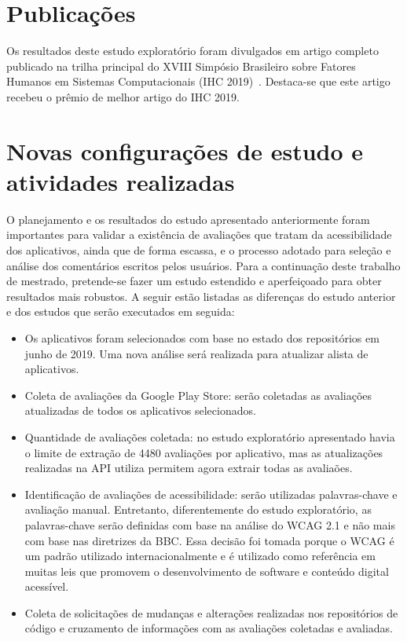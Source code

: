 \section{Publicações}

Os resultados deste estudo exploratório foram divulgados em artigo completo publicado na trilha principal do XVIII Simpósio Brasileiro sobre Fatores Humanos em Sistemas Computacionais (IHC 2019)~\cite{ihc2019}. Destaca-se que este artigo recebeu o prêmio de melhor artigo do IHC 2019. 

\section{Novas configurações de estudo e atividades realizadas}

O planejamento e os resultados do estudo apresentado anteriormente foram importantes para validar a existência de avaliações que tratam da acessibilidade dos aplicativos, ainda que de forma escassa, e o processo adotado para seleção e análise dos comentários escritos pelos usuários. 
Para a continuação deste trabalho de mestrado, pretende-se fazer um estudo estendido e aperfeiçoado para obter resultados mais robustos. A seguir estão listadas as diferenças do estudo anterior e dos estudos que serão executados em seguida:
\begin{itemize}
 \item Os aplicativos foram selecionados com base no estado dos repositórios em junho de 2019. Uma nova análise será realizada para atualizar alista de aplicativos.
 \item Coleta de avaliações da Google Play Store: serão coletadas as avaliações atualizadas de todos os aplicativos selecionados.
 \item Quantidade de avaliações coletada: no estudo exploratório apresentado havia o limite de extração de 4480 avaliações por aplicativo, mas as atualizações realizadas na API utiliza permitem agora extrair todas as avaliaões.
 \item Identificação de avaliações de acessibilidade: serão utilizadas palavras-chave e avaliação manual. Entretanto, diferentemente do estudo exploratório, as palavras-chave serão definidas com base na análise do WCAG 2.1 e não mais com base nas diretrizes da BBC. Essa decisão foi tomada porque o WCAG é um padrão utilizado internacionalmente e é utilizado como referência em muitas leis que promovem o desenvolvimento de software e conteúdo digital acessível. 
 \item Coleta de solicitações de mudanças e alterações realizadas nos repositórios de código e cruzamento de informações com as avaliações coletadas e avaliadas.
 
\end{itemize}


